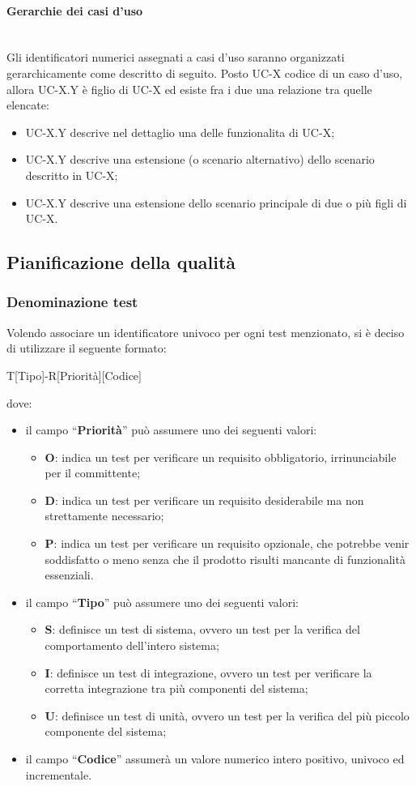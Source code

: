 \documentclass[11pt,a4paper]{article}
\begin{document}
\paragraph{Gerarchie dei casi d'uso} 
\noindent \\
 Gli identificatori numerici assegnati a casi d'uso saranno organizzati gerarchicamente come descritto di seguito. Posto UC-X codice di un caso d'uso, allora UC-X.Y è figlio di UC-X ed esiste fra i due una relazione tra quelle elencate:
\begin{itemize}
\item UC-X.Y descrive nel dettaglio una delle funzionalita di UC-X;
\item UC-X.Y descrive una estensione (o scenario alternativo) dello scenario descritto in UC-X; 
\item UC-X.Y descrive una estensione dello scenario principale di due o più figli di UC-X.
\end{itemize}
\subsection{Pianificazione della qualità}
\subsubsection{Denominazione test}
Volendo associare un identificatore univoco per ogni test menzionato, si \`e deciso di utilizzare il seguente formato:
	\begin{center}
		T[Tipo]-R[Priorità][Codice]
\end{center}
dove:
\begin{itemize}
\item il campo “\textbf{Priorità}” può assumere uno dei seguenti valori:
\begin{itemize}
	\item \textbf{O}: indica un test per verificare un requisito obbligatorio, irrinunciabile per il committente;
	\item \textbf{D}: indica un test per verificare un requisito desiderabile ma non strettamente necessario;
	\item \textbf{P}: indica un test per verificare un requisito opzionale, che potrebbe venir soddisfatto o meno senza che il prodotto risulti mancante di funzionalità essenziali.
\end{itemize}
\item il campo “\textbf{Tipo}” può assumere uno dei seguenti valori:
\begin{itemize}
	\item \textbf{S}: definisce un test di sistema, ovvero un test per la verifica del comportamento dell'intero sistema;
	\item \textbf{I}: definisce un test di integrazione, ovvero un test per verificare la corretta integrazione tra più componenti del sistema;
	\item \textbf{U}: definisce un test di unità, ovvero un test per la verifica del più piccolo componente del sistema;
\end{itemize}
\item il campo “\textbf{Codice}” assumerà un valore numerico intero positivo, univoco ed incrementale.
\end{itemize}
\newpage
	
\end{document}
